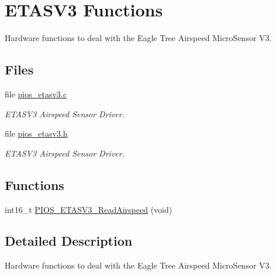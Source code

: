\hypertarget{group___p_i_o_s___e_t_a_s_v3}{\section{\-E\-T\-A\-S\-V3 \-Functions}
\label{group___p_i_o_s___e_t_a_s_v3}
}


\-Hardware functions to deal with the \-Eagle \-Tree \-Airspeed \-Micro\-Sensor \-V3.  


\subsection*{\-Files}
\begin{DoxyCompactItemize}
\item 
file \hyperlink{pios__etasv3_8c}{pios\-\_\-etasv3.\-c}
\begin{DoxyCompactList}\small\item\em \-E\-T\-A\-S\-V3 \-Airspeed \-Sensor \-Driver. \end{DoxyCompactList}\item 
file \hyperlink{pios__etasv3_8h}{pios\-\_\-etasv3.\-h}
\begin{DoxyCompactList}\small\item\em \-E\-T\-A\-S\-V3 \-Airspeed \-Sensor \-Driver. \end{DoxyCompactList}\end{DoxyCompactItemize}
\subsection*{\-Functions}
\begin{DoxyCompactItemize}
\item 
int16\-\_\-t \hyperlink{group___p_i_o_s___e_t_a_s_v3_ga31f2503f2dd42f823565acc582c50175}{\-P\-I\-O\-S\-\_\-\-E\-T\-A\-S\-V3\-\_\-\-Read\-Airspeed} (void)
\end{DoxyCompactItemize}


\subsection{\-Detailed \-Description}
\-Hardware functions to deal with the \-Eagle \-Tree \-Airspeed \-Micro\-Sensor \-V3. 

